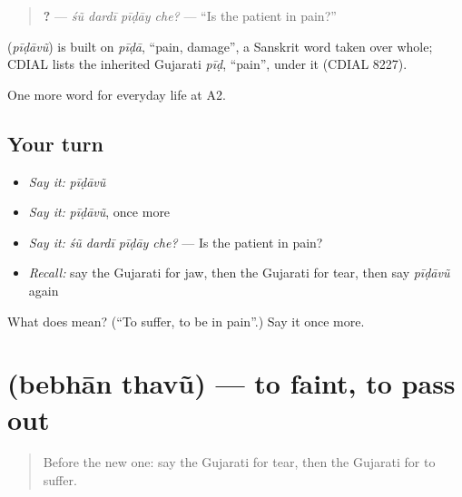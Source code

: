 \begin{quote}
\textbf{   ?} — \emph{śũ dardī pīḍāy che?} — \textquotedblleft{}Is the patient in pain?\textquotedblright{}
\end{quote}

\begin{cousinweb}
\textbf{} (\emph{pīḍāvũ}) is built on \emph{pīḍā}, \textquotedblleft{}pain, damage\textquotedblright{}, a Sanskrit word taken over whole; CDIAL lists the inherited Gujarati \emph{pīḍ}, \textquotedblleft{}pain\textquotedblright{}, under it (CDIAL 8227).
\end{cousinweb}

\begin{grammarlens}[title={What you've built}]
One more word for everyday life at A2.
\end{grammarlens}

\subsection*{Your turn}
\begin{itemize}
\raggedright
  \item \emph{Say it:} \emph{pīḍāvũ}
  \item \emph{Say it:} \emph{pīḍāvũ}, once more
  \item \emph{Say it:} \emph{śũ dardī pīḍāy che?} — Is the patient in pain?
  \item \emph{Recall:} say the Gujarati for jaw, then the Gujarati for tear, then say \emph{pīḍāvũ} again
\end{itemize}

\begin{tcolorbox}[breakable,colback=teal!4,colframe=teal!35!black,title={Before you move on}]
What does  mean? (\textquotedblleft{}To suffer, to be in pain\textquotedblright{}.) Say it once more.
\end{tcolorbox}
\section[\texorpdfstring{\gu{બેભાન} \gu{થવું} (bebhān thavũ)}{બેભાન થવું (bebhān thavũ)}]{  (bebhān thavũ) — to faint, to pass out}

\label{lesson:GU-C230-bebhan-thavu}



\begin{quote}
Before the new one: say the Gujarati for tear, then the Gujarati for to suffer.
\end{quote}


